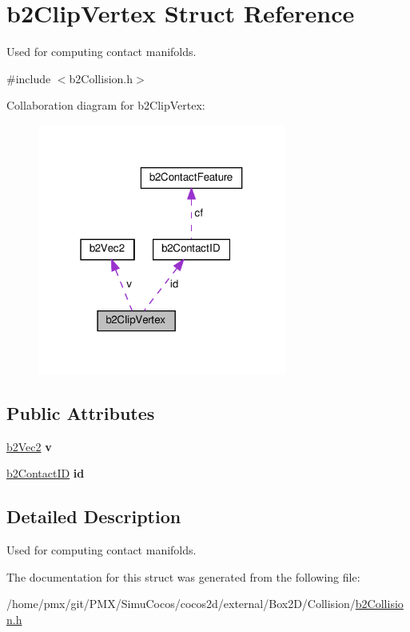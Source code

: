 \hypertarget{structb2ClipVertex}{}\section{b2\+Clip\+Vertex Struct Reference}
\label{structb2ClipVertex}


Used for computing contact manifolds.  




{\ttfamily \#include $<$b2\+Collision.\+h$>$}



Collaboration diagram for b2\+Clip\+Vertex\+:
\nopagebreak
\begin{figure}[H]
\begin{center}
\leavevmode
\includegraphics[width=232pt]{structb2ClipVertex__coll__graph}
\end{center}
\end{figure}
\subsection*{Public Attributes}
\begin{DoxyCompactItemize}
\item 
\mbox{\label{structb2ClipVertex_a6c8d8e4c0667755d5295a9c0d91d5b87}} 
\hyperlink{structb2Vec2}{b2\+Vec2} {\bfseries v}
\item 
\mbox{\label{structb2ClipVertex_ac0f6d48eafc40a665bc18d4aa821689d}} 
\hyperlink{unionb2ContactID}{b2\+Contact\+ID} {\bfseries id}
\end{DoxyCompactItemize}


\subsection{Detailed Description}
Used for computing contact manifolds. 

The documentation for this struct was generated from the following file\+:\begin{DoxyCompactItemize}
\item 
/home/pmx/git/\+P\+M\+X/\+Simu\+Cocos/cocos2d/external/\+Box2\+D/\+Collision/\hyperlink{cocos2d_2external_2Box2D_2Collision_2b2Collision_8h}{b2\+Collision.\+h}\end{DoxyCompactItemize}
